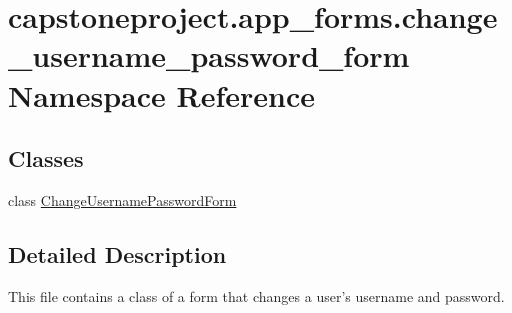 \hypertarget{namespacecapstoneproject_1_1app__forms_1_1change__username__password__form}{}\section{capstoneproject.\+app\+\_\+forms.\+change\+\_\+username\+\_\+password\+\_\+form Namespace Reference}
\label{namespacecapstoneproject_1_1app__forms_1_1change__username__password__form}
\subsection*{Classes}
\begin{DoxyCompactItemize}
\item 
class \mbox{\hyperlink{classcapstoneproject_1_1app__forms_1_1change__username__password__form_1_1_change_username_password_form}{Change\+Username\+Password\+Form}}
\end{DoxyCompactItemize}


\subsection{Detailed Description}
\begin{DoxyVerb}This file contains a class of a form that changes a user's username and password.
\end{DoxyVerb}
 
